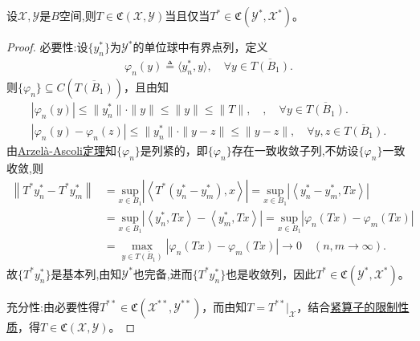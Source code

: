 \documentclass[../../main.tex]{subfiles}%
\begin{document}
\begin{theorem}
设$\mathscr{X},\mathscr{Y}$是$B$空间,则$T\in\mathfrak{C}(\mathscr{X},\mathscr{Y})$当且仅当$T^*\in\mathfrak{C}(\mathscr{Y}^*,\mathscr{X}^*)$。
\end{theorem}
\begin{proof}

{\heiti 必要性:}设$\{y_n^*\}$为$\mathscr{Y}^*$的单位球中有界点列，定义
\begin{align*}
\varphi_n(y)\triangleq\langle y_n^*,y\rangle,\quad \forall y\in\overline{T(B_1)}.
\end{align*}
则$\{\varphi_n\}\subseteq C(\overline{T(B_1)})$，且由知
\begin{gather*}
|\varphi _n(y)|\leqslant \parallel y_{n}^{*}\parallel \cdot \parallel y\parallel \leqslant \parallel y\parallel \leqslant \parallel T\parallel ,\quad ,\quad \forall y\in \overline{T(B_1)}.
\\
|\varphi _n(y)-\varphi _n(z)|\leqslant \parallel y_{n}^{*}\parallel \cdot \parallel y-z\parallel \leqslant \parallel y-z\parallel ,\quad \forall y,z\in \overline{T(B_1)}.
\end{gather*}
由\hyperref[theorem:泛函分析--Arzelà-Ascoli定理]{Arzelà-Ascoli定理}知$\{\varphi_n\}$是列紧的，即$\{\varphi_n\}$存在一致收敛子列,不妨设$\{\varphi_n\}$一致收敛,则
\begin{align*}
\left\| T^*y_{n}^{*}-T^*y_{m}^{*} \right\| &=\underset{x\in B_1}{\mathrm{sup}}\left| \left< T^*\left( y_{n}^{*}-y_{m}^{*} \right) ,x \right> \right|=\underset{x\in B_1}{\mathrm{sup}}\left| \left< y_{n}^{*}-y_{m}^{*},Tx \right> \right|
\\
&=\underset{x\in B_1}{\mathrm{sup}}\left| \left< y_{n}^{*},Tx \right> -\left< y_{m}^{*},Tx \right> \right|=\underset{x\in B_1}{\mathrm{sup}}\left| \varphi _n\left( Tx \right) -\varphi _m\left( Tx \right) \right|
\\
&=\underset{y\in \overline{T\left( B_1 \right) }}{\max}\left| \varphi _n\left( Tx \right) -\varphi _m\left( Tx \right) \right|\rightarrow 0\quad \left( n,m\rightarrow \infty \right) .
\end{align*}
故$\{T^*y_n^*\}$是基本列,由知$\mathscr{Y}^*$也完备,进而$\{T^*y_n^*\}$也是收敛列，因此$T^*\in\mathfrak{C}(\mathscr{Y}^*,\mathscr{X}^*)$。

{\heiti 充分性:}由必要性得$T^{**}\in\mathfrak{C}(\mathscr{X}^{**},\mathscr{Y}^{**})$，而由知$T=T^{**}|_{\mathscr{X}}$，结合\hyperref[proposition:泛函分析--命题3.1.2-4]{紧算子的限制性质}，得$T\in\mathfrak{C}(\mathscr{X},\mathscr{Y})$。

\end{proof}
\end{document}
